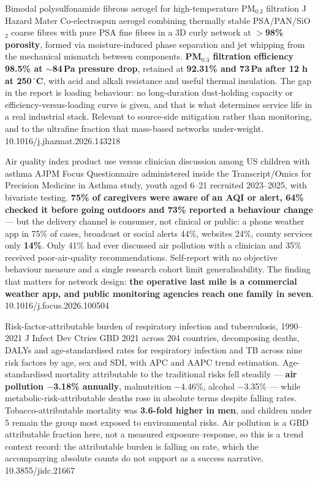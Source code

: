 \documentclass[10pt]{article}
\begin{document}
{Bimodal polysulfonamide fibrous aerogel for high-temperature PM$_{0.3}$ filtration}
{J Hazard Mater}
{Co-electrospun aerogel combining thermally stable PSA/PAN/SiO$_2$ coarse fibres with pure
PSA fine fibres in a 3D curly network at \textbf{$>$98\% porosity}, formed via
moisture-induced phase separation and jet whipping from the mechanical mismatch between
components. \textbf{PM$_{0.3}$ filtration efficiency 98.5\% at $\sim$84\,Pa pressure drop},
retained at \textbf{92.31\% and 73\,Pa after 12 h at 250\,$^\circ$C}, with acid and alkali
resistance and useful thermal insulation. The gap in the report is loading behaviour: no
long-duration dust-holding capacity or efficiency-versus-loading curve is given, and that
is what determines service life in a real industrial stack. Relevant to source-side
mitigation rather than monitoring, and to the ultrafine fraction that mass-based networks
under-weight.}
{10.1016/j.jhazmat.2026.143218}

{Air quality index product use versus clinician discussion among US children with asthma}
{AJPM Focus}
{Questionnaire administered inside the Transcript/Omics for Precision Medicine in Asthma
study, youth aged 6--21 recruited 2023--2025, with bivariate testing. \textbf{75\% of
caregivers were aware of an AQI or alert, 64\% checked it before going outdoors and 73\%
reported a behaviour change} --- but the delivery channel is consumer, not clinical or
public: a phone weather app in 75\% of cases, broadcast or social alerts 44\%, websites
24\%, county services only \textbf{14\%}. Only 41\% had ever discussed air pollution with a
clinician and 35\% received poor-air-quality recommendations. Self-report with no objective
behaviour measure and a single research cohort limit generalisability. The finding that
matters for network design: \textbf{the operative last mile is a commercial weather app,
and public monitoring agencies reach one family in seven}.}
{10.1016/j.focus.2026.100504}

{Risk-factor-attributable burden of respiratory infection and tuberculosis, 1990--2021}
{J Infect Dev Ctries}
{GBD 2021 across 204 countries, decomposing deaths, DALYs and age-standardised rates for
respiratory infection and TB across nine risk factors by age, sex and SDI, with APC and
AAPC trend estimation. Age-standardised mortality attributable to the traditional risks
fell steadily --- \textbf{air pollution $-$3.18\% annually}, malnutrition $-$4.46\%, alcohol
$-$3.35\% --- while metabolic-risk-attributable deaths rose in absolute terms despite
falling rates. Tobacco-attributable mortality was \textbf{3.6-fold higher in men}, and
children under 5 remain the group most exposed to environmental risks. Air pollution is a
GBD attributable fraction here, not a measured exposure--response, so this is a trend
context record: the attributable burden is falling on rate, which the accompanying
absolute counts do not support as a success narrative.}
{10.3855/jidc.21667}
\end{document}

